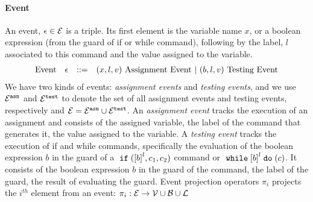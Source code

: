 

\paragraph{Event}
An event, $\mathtt{\epsilon} \in \mathcal{E}$ is a triple.
Its first element is the variable name $x$,
or a boolean expression (from the guard of if or while command), 
following by 
 the label, $l$ associated to this command and the value assigned to the variable.
 \[
  \begin{array}{llll}
    \mbox{Event} 
    & \mathtt{\epsilon} & ::= & 
    ({x}, l, v) ~ \mbox{Assignment Event} 
    ~|~(b, l, v) ~ \mbox{Testing Event}
  \end{array}
  \]  
 We have two kinds of events: \emph{assignment events} and \emph{testing events},
 and we use $\mathcal{E}^{\mathtt{{asn}}}$ and $\mathcal{E}^{\mathtt{{test}}}$ to denote the set of all assignment events and testing events, respectively and $\mathcal{E} = \mathcal{E}^{\mathtt{{asn}}} \cup \mathcal{E}^{\mathtt{{test}}}$.
 An \emph{assignment event} tracks the execution of an assignment and consists of the assigned variable, the label of the command that generates it, the value assigned to the variable.
 A \emph{testing event} tracks the execution of if and while commands, specifically the evaluation of the boolean expression $b$ in the guard of a $\eif(\clabel{b}^l, c_1, c_2)$ command or $\ewhile \clabel{b}^l \edo (c)$.
 It consists of the boolean expression $b$ in the guard of the command, the label of the guard, the result of evaluating the guard.
%
Event projection operators $\pi_i$ projects the $i^{th}$ element from an event: 
$\pi_i : \mathcal{E} \to \mathcal{V} \cup \mathcal{B} \cup \mathcal{L} $

